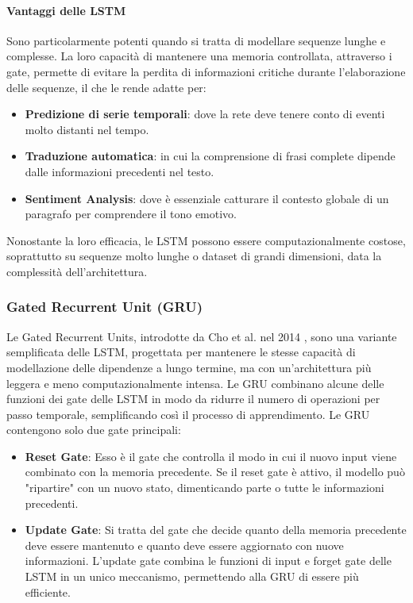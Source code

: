 \paragraph{Vantaggi delle LSTM}
Sono particolarmente potenti quando si tratta di modellare sequenze lunghe e complesse. La loro capacità di mantenere una memoria controllata, attraverso i gate, permette di evitare la perdita di informazioni critiche durante l'elaborazione delle sequenze, il che le rende adatte per:
\begin{itemize}
	\item \textbf{Predizione di serie temporali}: dove la rete deve tenere conto di eventi molto distanti nel tempo.
	\item \textbf{Traduzione automatica}: in cui la comprensione di frasi complete dipende dalle informazioni precedenti nel testo.
	\item \textbf{Sentiment Analysis}: dove è essenziale catturare il contesto globale di un paragrafo per comprendere il tono emotivo.
\end{itemize}
Nonostante la loro efficacia, le LSTM possono essere computazionalmente costose, soprattutto su sequenze molto lunghe o dataset di grandi dimensioni, data la complessità dell'architettura.

\subsubsection{Gated Recurrent Unit (GRU)}
Le Gated Recurrent Units, introdotte da Cho et al. nel 2014 \cite{chung2014empiricalevaluationgatedrecurrent}, sono una variante semplificata delle LSTM, progettata per mantenere le stesse capacità di modellazione delle dipendenze a lungo termine, ma con un'architettura più leggera e meno computazionalmente intensa. Le GRU combinano alcune delle funzioni dei gate delle LSTM in modo da ridurre il numero di operazioni per passo temporale, semplificando così il processo di apprendimento.
Le GRU contengono solo due gate principali:
\begin{itemize}
	\item \textbf{Reset Gate}: Esso è il gate che controlla il modo in cui il nuovo input viene combinato con la memoria precedente. Se il reset gate è attivo, il modello può "ripartire" con un nuovo stato, dimenticando parte o tutte le informazioni precedenti.
	\item \textbf{Update Gate}: Si tratta del gate che decide quanto della memoria precedente deve essere mantenuto e quanto deve essere aggiornato con nuove informazioni. L'update gate combina le funzioni di input e forget gate delle LSTM in un unico meccanismo, permettendo alla GRU di essere più efficiente.
\end{itemize}

